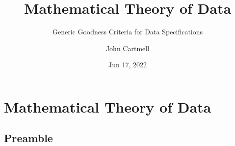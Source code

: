 

\usepackage{mathptmx}
\usepackage{amsfonts}
\usepackage{wasysym}
\usepackage{url}
\usepackage{hyperref}


\newcommand{\sharedmacros}{../../SharedMacros}










\renewcommand{\erpictureFolder}[0]{../../SharedPictures}
\setcounter{equation}{0}





\title[John Cartmell]{Mathematical Theory of Data}
\subtitle{Generic Goodness Criteria for Data Specifications}
\author{John Cartmell}
\date{Jun 17, 2022}

\usepackage{framed}
\usepackage{bibentry}
\usepackage{colortbl}
\usepackage{ulem}   %
\usepackage{listings}
\usepackage{arydshln} %
\usepackage{pst-arrow} %





\begin{frame}
\titlepage
\end{frame}
\iffalse
\section{Mathematical Theory of Data}
\subsection{Preamble}


